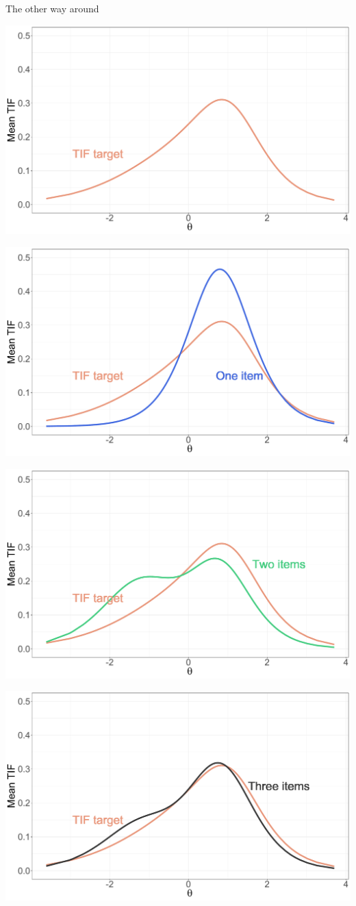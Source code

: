 \documentclass[aspectratio=149, xcolor=table]{beamer}
\begin{document}
\begin{frame}{The other way around}


\begin{overprint}
	\centering
	\centering
	\includegraphics[width=.80\textwidth]{img/TIF-target.pdf}
	
	\centering
	\includegraphics[width=.80\textwidth]{img/TIF-first.pdf}
	
	\centering
	\includegraphics[width=.80\textwidth]{img/TIF-second.pdf}
	
		\centering
	\includegraphics[width=.80\textwidth]{img/TIF-third.pdf}
\end{overprint}
\end{frame}
\end{document}
